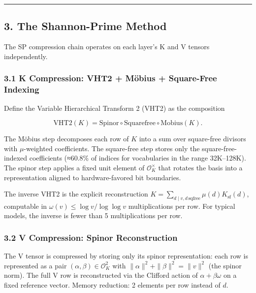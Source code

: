 \documentclass[
  11pt,
]{article}
\begin{document}
\begin{center}\rule{0.5\linewidth}{0.5pt}\end{center}

\hypertarget{the-shannon-prime-method}{%
\subsection{3. The Shannon-Prime
Method}\label{the-shannon-prime-method}}

The SP compression chain operates on each layer's K and V tensors
independently.

\hypertarget{k-compression-vht2-muxf6bius-square-free-indexing}{%
\subsubsection{3.1 K Compression: VHT2 + Möbius + Square-Free
Indexing}\label{k-compression-vht2-muxf6bius-square-free-indexing}}

Define the Variable Hierarchical Transform 2 (VHT2) as the composition

\[\mathrm{VHT2}(K) = \mathrm{Spinor} \circ \mathrm{Squarefree} \circ \mathrm{Mobius}(K).\]

The Möbius step decomposes each row of \(K\) into a sum over square-free
divisors with \(\mu\)-weighted coefficients. The square-free step stores
only the square-free-indexed coefficients (≈60.8\% of indices for
vocabularies in the range 32K--128K). The spinor step applies a fixed
unit element of \(\mathcal{O}_K^\times\) that rotates the basis into a
representation aligned to hardware-favored bit boundaries.

The inverse VHT2 is the explicit reconstruction
\(K = \sum_{d \mid v, d \, \text{sqfree}} \mu(d) K_{\text{sf}}(d)\),
computable in \(\omega(v) \leq \log v / \log\log v\) multiplications per
row. For typical models, the inverse is fewer than 5 multiplications per
row.

\hypertarget{v-compression-spinor-reconstruction}{%
\subsubsection{3.2 V Compression: Spinor
Reconstruction}\label{v-compression-spinor-reconstruction}}

The V tensor is compressed by storing only its spinor representation:
each row is represented as a pair
\((\alpha, \beta) \in \mathcal{O}_K^2\) with
\(\|\alpha\|^2 + \|\beta\|^2 = \|v\|^2\) (the spinor norm). The full V
row is reconstructed via the Clifford action of
\(\alpha + \beta \omega\) on a fixed reference vector. Memory reduction:
2 elements per row instead of \(d\).
\end{document}
